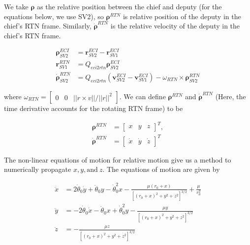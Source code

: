 We take $\boldsymbol{\rho}$ as the relative position between the chief and deputy (for the equations below, we use SV2), so $\boldsymbol{\rho}^{RTN}$ is relative position of the deputy in the chief's RTN frame. Similarly, $\boldsymbol{\dot{\rho}}^{RTN}$ is the relative velocity of the deputy in the chief's RTN frame.

\begin{align}
    \boldsymbol{\rho}_{SV2}^{ECI} &= \boldsymbol{r}^{ECI}_{SV2} - \boldsymbol{r}^{ECI}_{SV1}\\
    \boldsymbol{r}^{RTN}_{SV1} &= Q_{eci2rtn} \boldsymbol{\rho}_{SV2}^{ECI} \\
    \boldsymbol{\dot{\rho}}^{RTN}_{SV2} &= Q_{eci2rtn} \left(\boldsymbol{v}^{ECI}_{SV2} - \boldsymbol{v}^{ECI}_{SV1}\right)  - \omega_{RTN} \times \boldsymbol{\rho}^{RTN}_{SV2} \label{eq:v_rtn_rel}
\end{align}

where $\omega_{RTN} = \begin{bmatrix}
    0 & 0 & ||r\times v ||/||r||^2
\end{bmatrix}$. We can define $\boldsymbol{\rho}^{RTN}$ and $\boldsymbol{\dot{\rho}}^{RTN}$ (Here, the time derivative accounts for the rotating RTN frame) to be

\begin{align}
    \boldsymbol{\rho}^{RTN} &= \begin{bmatrix}
        x & y & z
    \end{bmatrix}^T, \\
    \boldsymbol{\dot{\rho}}^{RTN} &= \begin{bmatrix}
        \dot{x} & \dot{y} & \dot{z}
    \end{bmatrix}^T 
\end{align}

The non-linear equations of motion for relative motion give us a method to numerically propagate $x, y, \text{and} \ z$. The equations of motion are given by

\begin{align}
\ddot{x} &= 2\dot{\theta}_0 \dot{y} + \ddot{\theta}_0 y - \dot{\theta}_0^2 x -\frac{\mu (r_0 + x)}{\left[(r_0 + x)^2 + y^2 + z^2\right]^{3/2}} + \frac{\mu}{r_0^2} \\
\ddot{y} &= - 2\dot{\theta}_0 \dot{x} - \ddot{\theta}_0 x + \dot{\theta}_0^2 y  -\frac{\mu y}{\left[(r_0 + x)^2 + y^2 + z^2\right]^{3/2}} \\
\ddot{z} &= -\frac{\mu z}{\left[(r_0 + x)^2 + y^2 + z^2\right]^{3/2}}
\end{align}

